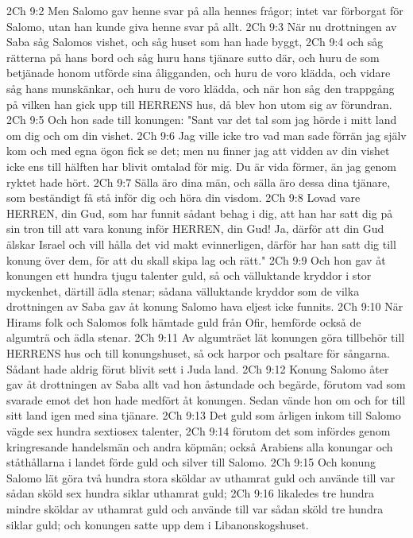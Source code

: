 2Ch 9:2  Men Salomo gav henne svar på alla hennes frågor; intet var förborgat för Salomo, utan han kunde giva henne svar på allt.
2Ch 9:3  När nu drottningen av Saba såg Salomos vishet, och såg huset som han hade byggt,
2Ch 9:4  och såg rätterna på hans bord och såg huru hans tjänare sutto där, och huru de som betjänade honom utförde sina åligganden, och huru de voro klädda, och vidare såg hans munskänkar, och huru de voro klädda, och när hon såg den trappgång på vilken han gick upp till HERRENS hus, då blev hon utom sig av förundran.
2Ch 9:5  Och hon sade till konungen: "Sant var det tal som jag hörde i mitt land om dig och om din vishet.
2Ch 9:6  Jag ville icke tro vad man sade förrän jag själv kom och med egna ögon fick se det; men nu finner jag att vidden av din vishet icke ens till hälften har blivit omtalad för mig. Du är vida förmer, än jag genom ryktet hade hört.
2Ch 9:7  Sälla äro dina män, och sälla äro dessa dina tjänare, som beständigt få stå inför dig och höra din visdom.
2Ch 9:8  Lovad vare HERREN, din Gud, som har funnit sådant behag i dig, att han har satt dig på sin tron till att vara konung inför HERREN, din Gud! Ja, därför att din Gud älskar Israel och vill hålla det vid makt evinnerligen, därför har han satt dig till konung över dem, för att du skall skipa lag och rätt."
2Ch 9:9  Och hon gav åt konungen ett hundra tjugu talenter guld, så och välluktande kryddor i stor myckenhet, därtill ädla stenar; sådana välluktande kryddor som de vilka drottningen av Saba gav åt konung Salomo hava eljest icke funnits.
2Ch 9:10  När Hirams folk och Salomos folk hämtade guld från Ofir, hemförde också de algumträ och ädla stenar.
2Ch 9:11  Av algumträet lät konungen göra tillbehör till HERRENS hus och till konungshuset, så ock harpor och psaltare för sångarna. Sådant hade aldrig förut blivit sett i Juda land.
2Ch 9:12  Konung Salomo åter gav åt drottningen av Saba allt vad hon åstundade och begärde, förutom vad som svarade emot det hon hade medfört åt konungen. Sedan vände hon om och for till sitt land igen med sina tjänare.
2Ch 9:13  Det guld som årligen inkom till Salomo vägde sex hundra sextiosex talenter,
2Ch 9:14  förutom det som infördes genom kringresande handelsmän och andra köpmän; också Arabiens alla konungar och ståthållarna i landet förde guld och silver till Salomo.
2Ch 9:15  Och konung Salomo lät göra två hundra stora sköldar av uthamrat guld och använde till var sådan sköld sex hundra siklar uthamrat guld;
2Ch 9:16  likaledes tre hundra mindre sköldar av uthamrat guld och använde till var sådan sköld tre hundra siklar guld; och konungen satte upp dem i Libanonskogshuset.
